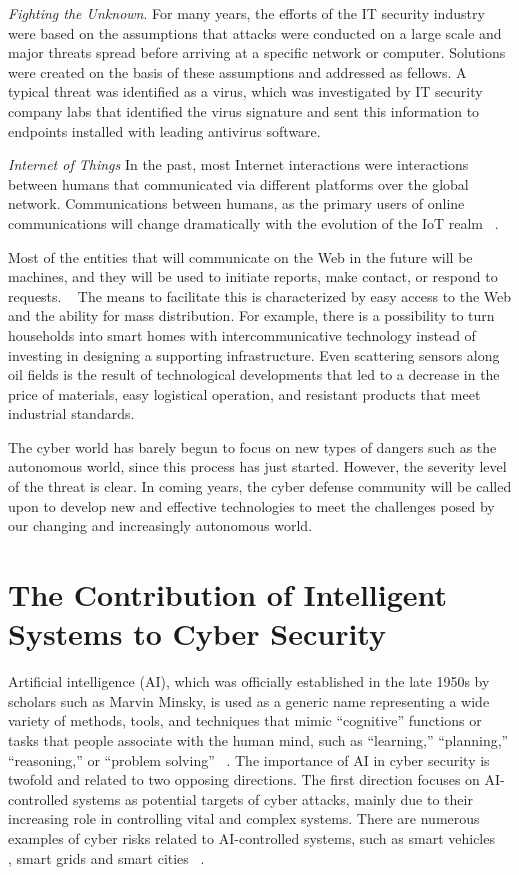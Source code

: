 \textit{Fighting the Unknown}. For many years, the efforts of the IT security industry were based on the assumptions 
that attacks were conducted on a large scale and major threats spread before arriving at a specific network or computer.
Solutions were created on the basis of these assumptions and addressed as fellows. A typical threat was identified as a virus, which was investigated 
by IT security company labs that identified the virus signature and sent this information to endpoints installed with leading antivirus software. 

\textit{Internet of Things} In the past, most Internet interactions were interactions between humans that communicated via different platforms over the global network. 
Communications between humans, as the primary users of online communications will change dramatically with the evolution of the IoT realm ~\cite{Ko:2016:STU:2909066.2835492}. 

Most of the entities that will communicate on the Web in the future will be machines, and they will be used to initiate 
reports, make contact, or respond to requests. ~\cite{Komninos:2012}
The means to facilitate this is characterized by easy access to the Web and the ability for mass distribution. For example, there is a possibility to turn households into smart homes with 
intercommunicative technology instead of investing in designing a supporting infrastructure. 
Even scattering sensors along oil fields is the result of technological developments that led to a decrease in 
the price of materials, easy logistical operation, and resistant products that meet industrial standards. ~\cite{Chen:2017:DAI:3046067.3046227}

The cyber world has barely begun to focus on new types of dangers such as the autonomous world, since this process has just started. However, the severity 
level of the threat is clear. In coming years, the cyber defense community will be called upon to develop 
new and effective technologies to meet the challenges posed by our changing and increasingly autonomous world.


\section{The Contribution of Intelligent Systems to Cyber Security}\label{sec:cont-intelligent-systems-cyber-security}

Artificial intelligence (AI), which was officially established in the late 1950s by scholars such as Marvin Minsky, is used as a generic name representing a wide variety of
methods, tools, and techniques that mimic “cognitive” functions or tasks that people
associate with the human mind, such as “learning,” “planning,” “reasoning,” or “problem solving” ~\cite{Russell:1995}.
The importance of AI in cyber security is twofold and related to two opposing directions. The first direction focuses on 
AI-controlled systems as potential targets of cyber attacks, mainly due to their increasing role in controlling vital and complex 
systems. There are numerous examples of cyber risks related to AI-controlled systems, such as smart vehicles ~\cite{Berger:2013:PLC:2489103.2514809}
, smart grids and smart cities ~\cite{ALDAIRI20171086}.

